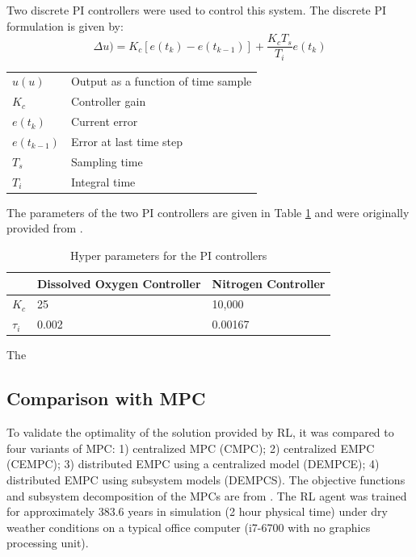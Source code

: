 Two discrete PI controllers were used to control this system.  The discrete PI formulation is given by:
\begin{equation}
    \Delta u) = K_c[e(t_k) - e(t_{k-1})] + \dfrac{K_cT_s}{T_i}e(t_k)
\end{equation}
\begin{table}[H]
	\begin{tabular}{p{1.5cm}p{6.5cm}}
	$u(u)$ & Output as a function of time sample \\
	$K_c$ & Controller gain \\
	$e(t_k)$ & Current error \\
	$e(t_{k-1})$ & Error at last time step \\
	$T_s$ & Sampling time \\
	$T_i$ & Integral time \\
	\end{tabular}
\end{table}

The parameters of the two PI controllers are given in Table \ref{tab04:pi_parameters} and were originally provided from \cite{wwtp}.

\begin{table}[h]
	\begin{center}
	\def\arraystretch{1.2}
	\begin{tabular}{p{1.5cm}p{5.5cm}p{5.5cm}}
	\hline
	 & Dissolved Oxygen Controller & Nitrogen Controller \\
	 \hline
	 $K_c$ & 25 & 10,000 \\
	 $\tau_i$ & 0.002 & 0.00167 \\
	\hline
	\end{tabular}
	\end{center}
	\caption{Hyper parameters for the PI controllers}
	\label{tab04:pi_parameters}
\end{table}

The 

\subsection{Comparison with MPC}
To validate the optimality of the solution provided by RL, it was compared to four variants of MPC: 1) centralized MPC (CMPC); 2) centralized EMPC (CEMPC); 3) distributed EMPC using a centralized model (DEMPCE); 4) distributed EMPC using subsystem models (DEMPCS).  The objective functions and subsystem decomposition of the MPCs are from \cite{an_mpc}.  The RL agent was trained for approximately 383.6 years in simulation (2 hour physical time) under dry weather conditions on a typical office computer (i7-6700 with no graphics processing unit).

